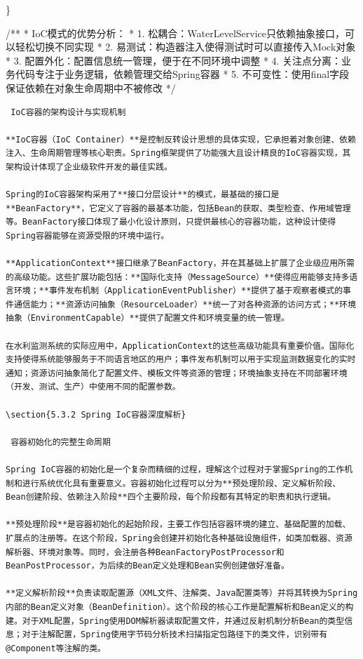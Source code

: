 \}

/** * IoC模式的优势分析： * 1. 松耦合：WaterLevelService只依赖抽象接口，可以轻松切换不同实现 * 2. 易测试：构造器注入使得测试时可以直接传入Mock对象 * 3. 配置外化：配置信息统一管理，便于在不同环境中调整 * 4. 关注点分离：业务代码专注于业务逻辑，依赖管理交给Spring容器 * 5. 不可变性：使用final字段保证依赖在对象生命周期中不被修改 */

\begin{lstlisting}
 IoC容器的架构设计与实现机制

**IoC容器（IoC Container）**是控制反转设计思想的具体实现，它承担着对象创建、依赖注入、生命周期管理等核心职责。Spring框架提供了功能强大且设计精良的IoC容器实现，其架构设计体现了企业级软件开发的最佳实践。

Spring的IoC容器架构采用了**接口分层设计**的模式，最基础的接口是**BeanFactory**，它定义了容器的最基本功能，包括Bean的获取、类型检查、作用域管理等。BeanFactory接口体现了最小化设计原则，只提供最核心的容器功能，这种设计使得Spring容器能够在资源受限的环境中运行。

**ApplicationContext**接口继承了BeanFactory，并在其基础上扩展了企业级应用所需的高级功能。这些扩展功能包括：**国际化支持（MessageSource）**使得应用能够支持多语言环境；**事件发布机制（ApplicationEventPublisher）**提供了基于观察者模式的事件通信能力；**资源访问抽象（ResourceLoader）**统一了对各种资源的访问方式；**环境抽象（EnvironmentCapable）**提供了配置文件和环境变量的统一管理。

在水利监测系统的实际应用中，ApplicationContext的这些高级功能具有重要价值。国际化支持使得系统能够服务于不同语言地区的用户；事件发布机制可以用于实现监测数据变化的实时通知；资源访问抽象简化了配置文件、模板文件等资源的管理；环境抽象支持在不同部署环境（开发、测试、生产）中使用不同的配置参数。

\section{5.3.2 Spring IoC容器深度解析}

 容器初始化的完整生命周期

Spring IoC容器的初始化是一个复杂而精细的过程，理解这个过程对于掌握Spring的工作机制和进行系统优化具有重要意义。容器初始化过程可以分为**预处理阶段、定义解析阶段、Bean创建阶段、依赖注入阶段**四个主要阶段，每个阶段都有其特定的职责和执行逻辑。

**预处理阶段**是容器初始化的起始阶段，主要工作包括容器环境的建立、基础配置的加载、扩展点的注册等。在这个阶段，Spring会创建并初始化各种基础设施组件，如类加载器、资源解析器、环境对象等。同时，会注册各种BeanFactoryPostProcessor和BeanPostProcessor，为后续的Bean定义处理和Bean实例创建做好准备。

**定义解析阶段**负责读取配置源（XML文件、注解类、Java配置类等）并将其转换为Spring内部的Bean定义对象（BeanDefinition）。这个阶段的核心工作是配置解析和Bean定义的构建。对于XML配置，Spring使用DOM解析器读取配置文件，并通过反射机制分析Bean的类型信息；对于注解配置，Spring使用字节码分析技术扫描指定包路径下的类文件，识别带有@Component等注解的类。
\end{lstlisting}

